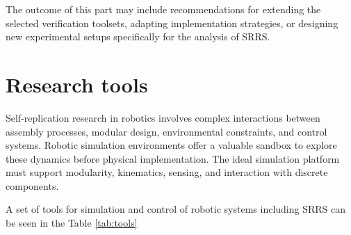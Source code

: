 The outcome of this part may include recommendations for extending the 
selected verification toolsets, adapting implementation strategies, or designing 
new experimental setups specifically for the analysis of SRRS.







\section{Research tools}


Self-replication research in robotics involves complex interactions between 
assembly processes, modular design, environmental constraints, 
and control systems. 
Robotic simulation environments offer a valuable sandbox to 
explore these dynamics before physical implementation. 
The ideal simulation platform must support modularity, kinematics, 
sensing, and interaction with discrete components.

A set of tools for simulation and control of robotic systems including SRRS can be 
seen in the Table \ref{tab:tools}

